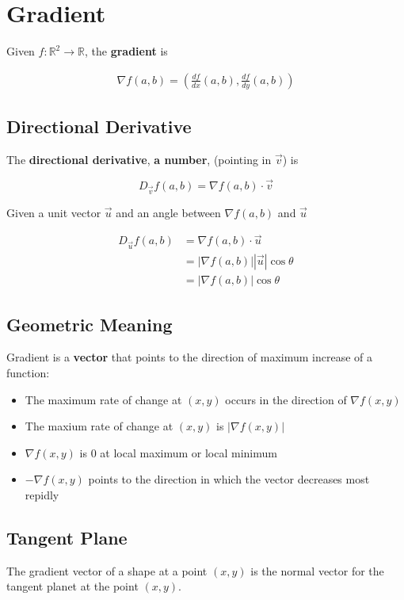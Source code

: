 \section{Gradient}

  Given $ f: \mathbb{R}^{2} \to \mathbb{R} $, the \textbf{gradient} is

  \begin{align}
    \nabla f \left( a, b \right) =
    \left(
      \frac{df}{dx} \left( a, b \right),
      \frac{df}{dy} \left( a, b \right)
    \right)
  \end{align}

  \subsection{Directional Derivative}

    The \textbf{directional derivative}, \textbf{a number}, (pointing in $ \vec{v} $) is

    \begin{equation}
      D_{\vec{v}} f \left( a, b \right) =
      \nabla f \left( a, b \right) \cdot \vec{v}
    \end{equation}

    Given a unit vector $ \vec{u} $ and an angle between
    $ \nabla f \left( a, b \right) $ and $ \vec{u} $

    \begin{align*}
      D_{\vec{u}} f \left( a, b \right) &=
      \nabla f \left( a, b \right) \cdot \vec{u} \\
      &= \left| \nabla f \left( a, b \right) \right|
      \left| \vec{u} \right| \cos\theta \\
      &= \left| \nabla f \left( a, b \right) \right| \cos\theta
    \end{align*}

  \subsection{Geometric Meaning}

    Gradient is a \textbf{vector} that
    points to the direction of maximum increase of a function:

    \begin{itemize}
      \item The maximum rate of change at $ \left( x, y \right) $
      occurs in the direction of $ \nabla f \left( x, y \right) $
      \item The maxium rate of change at $ \left( x, y \right) $  is
      $ \left| \nabla f \left( x, y \right) \right| $
      \item $ \nabla f \left( x, y \right) $ is $ 0 $ at local maximum or
      local minimum
      \item $ - \nabla f \left( x, y \right) $ points to the direction
      in which the vector decreases most repidly
    \end{itemize}

  \subsection{Tangent Plane}

    The gradient vector of a shape at a point $ (x, y) $ is the normal
    vector for the tangent planet at the point $ (x, y) $.